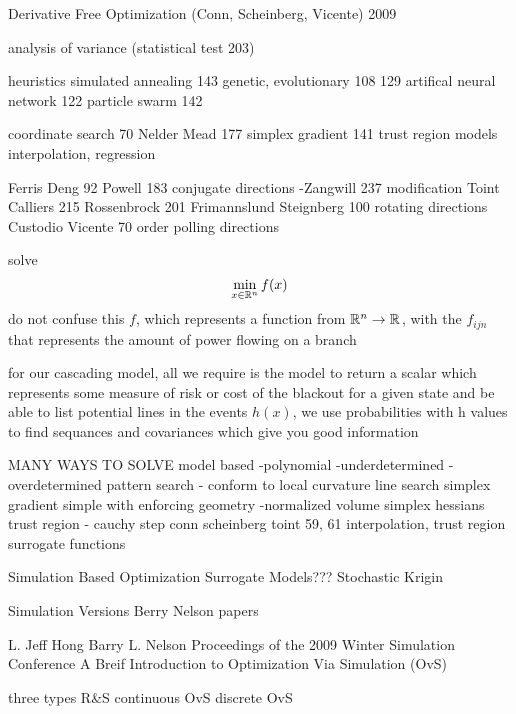 
Derivative Free Optimization  (Conn, Scheinberg, Vicente) 2009  \cite{conn_2009}

analysis of variance (statistical test 203)

heuristics
simulated annealing 143
genetic, evolutionary 108 129
artifical neural network 122
particle swarm 142

coordinate search 70
Nelder Mead 177
simplex gradient 141
trust region models
interpolation, regression

Ferris Deng 92
Powell 183 conjugate directions
-Zangwill 237 modification
Toint Calliers 215
Rossenbrock 201
Frimannslund Steignberg 100 rotating directions
Custodio Vicente 70 order polling directions


solve
\begin{equation}
\min_{x \in \mathbb{R}^{n}} f(x) 
\end{equation}
do not confuse this $f$, which represents a function from $\mathbb{R}^{n} \rightarrow \mathbb{R}^{}$, with the $f_{ijn}$ that represents the amount of power flowing on a branch

for our cascading model, all we require is the model to return a scalar which represents some measure of risk or cost of the blackout for a given state and be able to list potential lines in the events $h(x)$, we use probabilities with h values to find sequances and covariances which give you good information

MANY WAYS TO SOLVE
model based -polynomial -underdetermined -overdetermined
pattern search - conform to local curvature
line search
simplex gradient
simple with enforcing geometry -normalized volume
simplex hessians
trust region - cauchy step
conn scheinberg toint 59, 61	interpolation, trust region
surrogate functions


Simulation Based Optimization
Surrogate Models??? Stochastic Krigin


Simulation Versions
Berry Nelson papers



L. Jeff Hong
Barry L. Nelson
Proceedings of the 2009 Winter Simulation Conference
A Breif Introduction to Optimization Via Simulation (OvS) \cite{hong_2009}

three types
R\&S
continuous OvS
discrete OvS


